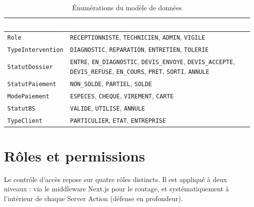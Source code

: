 \documentclass[11pt,a4paper]{report}
\begin{document}
\begin{table}[h!]
\centering
{}
\begin{tabularx}{\linewidth}{@{}l>{\raggedright\arraybackslash}X@{}}
\toprule
\rowcolor{km0blue}
\textcolor{white}{\textbf{Énumération}} & \textcolor{white}{\textbf{Valeurs possibles}} \\
\midrule
\texttt{Role} & \texttt{RECEPTIONNISTE}, \texttt{TECHNICIEN}, \texttt{ADMIN}, \texttt{VIGILE} \\
\texttt{TypeIntervention} & \texttt{DIAGNOSTIC}, \texttt{REPARATION}, \texttt{ENTRETIEN}, \texttt{TOLERIE} \\
\texttt{StatutDossier} & \texttt{ENTRE}, \texttt{EN\_DIAGNOSTIC}, \texttt{DEVIS\_ENVOYE}, \texttt{DEVIS\_ACCEPTE}, \texttt{DEVIS\_REFUSE}, \texttt{EN\_COURS}, \texttt{PRET}, \texttt{SORTI}, \texttt{ANNULE} \\
\texttt{StatutPaiement} & \texttt{NON\_SOLDE}, \texttt{PARTIEL}, \texttt{SOLDE} \\
\texttt{ModePaiement} & \texttt{ESPECES}, \texttt{CHEQUE}, \texttt{VIREMENT}, \texttt{CARTE} \\
\texttt{StatutBS} & \texttt{VALIDE}, \texttt{UTILISE}, \texttt{ANNULE} \\
\texttt{TypeClient} & \texttt{PARTICULIER}, \texttt{ETAT}, \texttt{ENTREPRISE} \\
\bottomrule
\end{tabularx}
\caption{Énumérations du modèle de données}
\end{table}

\chapter{Rôles et permissions}

Le contrôle d'accès repose sur quatre rôles distincts. Il est appliqué à deux niveaux :
via le middleware Next.js pour le routage, et systématiquement à l'intérieur de chaque
Server Action (défense en profondeur).
\end{document}

